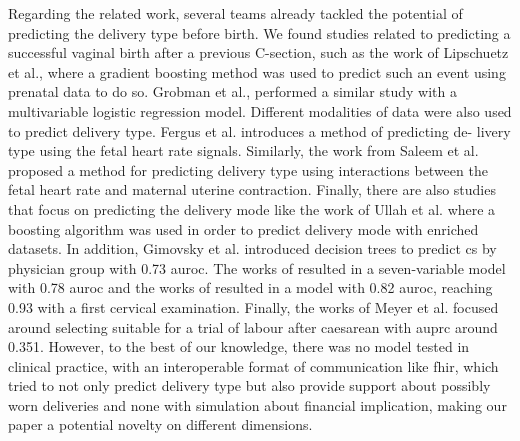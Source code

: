 
Regarding the related work, several teams already tackled the potential of predicting the delivery type before birth. We found studies related to predicting a successful vaginal birth after a previous C-section, such as the work of Lipschuetz et al., \cite{lipschuetzPredictionVaginalBirth2020}  where a gradient boosting method was used to predict such an event using prenatal data to do so. Grobman et al., \cite{grobman_development_2007} performed a similar study with a multivariable logistic regression model. Different modalities of data were also used to predict delivery type. Fergus et al. \cite{fergusClassificationCaesareanSection2017} introduces a method of predicting de- livery type using the fetal heart rate signals. Similarly, the work from Saleem et al. \cite{saleemStrategyClassificationVaginal2019a} proposed a method for predicting delivery type using interactions between the fetal heart rate and maternal uterine contraction. Finally, there are also studies that focus on predicting the delivery mode like the work of Ullah et al. \cite{ullah_reliable_2021} where a boosting algorithm was used in order to predict delivery mode with enriched datasets. In addition, Gimovsky et al. \cite{gimovskyBenchmarkingCesareanDelivery} introduced decision trees to predict \ac{cs} by physician group with 0.73 \ac{auroc}. The works of \cite{rossiRiskCalculatorPredict2020b} resulted in a seven-variable model with 0.78 \ac{auroc} and the works of \cite{guedaliaRealtimeDataAnalysis2020} resulted in a model with 0.82 \ac{auroc}, reaching 0.93 with a first cervical examination. Finally, the works of Meyer et al. \cite{meyerImplementationMachineLearning2020} focused around selecting suitable for a trial of labour after caesarean with \ac{auprc} around 0.351. However, to the best of our knowledge, there was no model tested in clinical practice, with an interoperable format of communication like \ac{fhir}, which tried to not only predict delivery type but also provide support about possibly worn deliveries and none with simulation about financial implication, making our paper a potential novelty on different dimensions.